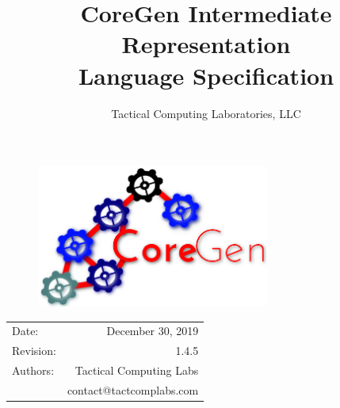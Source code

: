 \documentclass{article}
\title{CoreGen Intermediate Representation\\Language Specification} %
\author{Tactical Computing Laboratories, LLC} %
\date{} %
\begin{document}
\begin{figure}
\begin{center}
\includegraphics[width=3in]{figures/coregen-logo.png} %
\end{center}
\end{figure}

\maketitle %
\thispagestyle{fancy} %

\begin{center}
\begin{tabular}{l r}
Date: & December 30, 2019 \\ %
Revision: & 1.4.5 \\         %
Authors: & Tactical Computing Labs\\ %
& contact@tactcomplabs.com\\
\end{tabular}
\end{center}


\clearpage
\tableofcontents
\clearpage


\clearpage
\listoffigures
\lstlistoflistings
\listoftables
\clearpage

\end{document}
